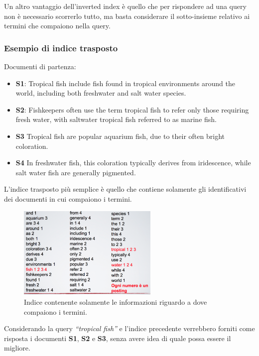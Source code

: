 Un altro vantaggio dell'inverted index è quello che per rispondere ad una query non è necessario scorrerlo tutto, ma basta considerare il sotto-insieme relativo ai termini che compaiono nella query.

\subsubsection{Esempio di indice trasposto}
Documenti di partenza:
\begin{itemize}
	\item \textbf{S1}: Tropical fish include fish found in tropical environments around the world, including both freshwater and salt water species.
	\item \textbf{S2}: Fishkeepers often use the term tropical fish to refer only those requiring fresh water, with saltwater tropical fish referred to as marine fish.
	\item \textbf{S3} Tropical fish are popular aquarium fish, due to their often bright coloration.
	\item \textbf{S4} In freshwater fish, this coloration typically derives from iridescence, while salt water fish are generally pigmented.
\end{itemize}

\noindent L'indice trasposto più semplice è quello che contiene solamente gli identificativi dei documenti in cui compaiono i termini.

\begin{figure}[htbp]
	\centering
	\includegraphics[width=0.6\textwidth]{./images/l6-index-1}
	\caption{Indice contenente solamente le informazioni riguardo a dove compaiono i termini.}
\end{figure}

\noindent Considerando la query \textit{``tropical fish''} e l'indice precedente verrebbero forniti come risposta i documenti \textbf{S1}, \textbf{S2} e \textbf{S3}, senza avere idea di quale possa essere il migliore.

